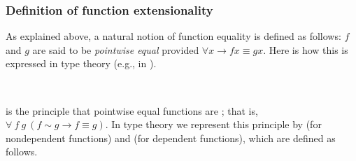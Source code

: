 \subsubsection{Definition of function extensionality}\label{sec:defin-funct-extens}

As explained above, a natural notion of function equality is defined as follows: \(f\) and \(g\) are said to be \emph{pointwise equal} provided \(∀ x → f x ≡ g x\). Here is how this is expressed in type theory (e.g., in \typtop).
\ccpad
\begin{code}%
\>[1]\AgdaSpace{}%
\AgdaSymbol{:}\AgdaSpace{}%
\AgdaSymbol{\{}\AgdaSpace{}%
\AgdaSymbol{:}\AgdaSpace{}%
\AgdaSpace{}%
\AgdaSpace{}%
\AgdaSymbol{\}}\AgdaSpace{}%
\AgdaSymbol{\{}\AgdaSpace{}%
\AgdaSymbol{:}\AgdaSpace{}%
\AgdaSpace{}%
\AgdaSpace{}%
\AgdaSpace{}%
\AgdaSpace{}%
\AgdaSymbol{\}}\AgdaSpace{}%
\AgdaSpace{}%
\AgdaSpace{}%
\AgdaSpace{}%
\AgdaSpace{}%
\AgdaSpace{}%
\AgdaSpace{}%
\AgdaSpace{}%
\AgdaSpace{}%
\AgdaSpace{}%
\AgdaSpace{}%
\<%
\\
%
\>[1]\AgdaSpace{}%
\AgdaSpace{}%
\AgdaSpace{}%
\AgdaSymbol{=}\AgdaSpace{}%
\AgdaSpace{}%
\AgdaSpace{}%
\AgdaSpace{}%
\AgdaSpace{}%
\AgdaSpace{}%
\AgdaSpace{}%
\AgdaSpace{}%
\<%
\end{code}
\ccpad
{} is the principle that pointwise equal functions are ; that is, \(\forall\ f\ g\ (f ∼ g → f ≡ g)\). In type theory we represent this principle by  (for nondependent functions) and  (for dependent functions), which are defined as follows.
\ccpad
